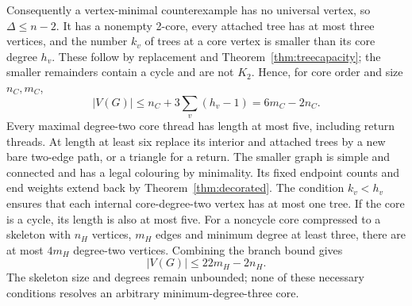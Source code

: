 Consequently a vertex-minimal counterexample has no universal vertex,
so $\Delta\le n-2$. It has a nonempty 2-core, every attached tree
has at most three vertices, and the number $k_v$ of trees at a
core vertex is smaller than its core degree $h_v$. These follow by
replacement and Theorem~\ref{thm:treecapacity}; the smaller remainders
contain a cycle and are not $K_2$. Hence, for core order and size
$n_C,m_C$,
\[
 |V(G)|\le n_C+3\sum_v(h_v-1)=6m_C-2n_C.
\]
Every maximal degree-two core thread has length at most five,
including return threads. At length at least six replace its interior
and attached trees by a new bare two-edge path, or a triangle for a
return. The smaller graph is simple and connected and has a legal
colouring by minimality. Its fixed endpoint counts and end weights
extend back by Theorem~\ref{thm:decorated}. The condition $k_v<h_v$
ensures that each internal core-degree-two vertex has at most one
tree. If the core is a cycle, its length is also at most five.
For a noncycle core compressed to a skeleton with $n_H$ vertices,
$m_H$ edges and minimum degree at least three, there are at most
$4m_H$ degree-two vertices. Combining the branch bound gives
\[
 |V(G)|\le22m_H-2n_H.
\]
The skeleton size and degrees remain unbounded; none of these
necessary conditions resolves an arbitrary minimum-degree-three core.
